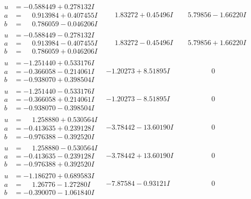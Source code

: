 \documentclass[1p]{elsarticle_modified}
\theoremstyle{definition}
\begin{document}
$$\begin{array}{c|c|c}
\begin{aligned}
u &= -0.588449 + 0.278132 I \\
a &= \phantom{-}0.913984 + 0.407455 I \\
b &= \phantom{-}0.786059 - 0.046206 I\end{aligned}
 & \phantom{-}1.83272 + 0.45496 I & \phantom{-}5.79856 - 1.66220 I \\ \hline\begin{aligned}
u &= -0.588449 - 0.278132 I \\
a &= \phantom{-}0.913984 - 0.407455 I \\
b &= \phantom{-}0.786059 + 0.046206 I\end{aligned}
 & \phantom{-}1.83272 - 0.45496 I & \phantom{-}5.79856 + 1.66220 I \\ \hline\begin{aligned}
u &= -1.251440 + 0.533176 I \\
a &= -0.366058 - 0.214061 I \\
b &= -0.938070 + 0.398504 I\end{aligned}
 & -1.20273 + 8.51895 I & \phantom{-0.000000 } 0 \\ \hline\begin{aligned}
u &= -1.251440 - 0.533176 I \\
a &= -0.366058 + 0.214061 I \\
b &= -0.938070 - 0.398504 I\end{aligned}
 & -1.20273 - 8.51895 I & \phantom{-0.000000 } 0 \\ \hline\begin{aligned}
u &= \phantom{-}1.258880 + 0.530564 I \\
a &= -0.413635 + 0.239128 I \\
b &= -0.976388 - 0.392520 I\end{aligned}
 & -3.78442 - 13.60190 I & \phantom{-0.000000 } 0 \\ \hline\begin{aligned}
u &= \phantom{-}1.258880 - 0.530564 I \\
a &= -0.413635 - 0.239128 I \\
b &= -0.976388 + 0.392520 I\end{aligned}
 & -3.78442 + 13.60190 I & \phantom{-0.000000 } 0 \\ \hline\begin{aligned}
u &= -1.186270 + 0.689583 I \\
a &= \phantom{-}1.26776 - 1.27280 I \\
b &= -0.390070 - 1.061840 I\end{aligned}
 & -7.87584 - 0.93121 I & \phantom{-0.000000 } 0 \\ \hline\begin{aligned}

\end{aligned}
\end{array}$$
\end{document}
